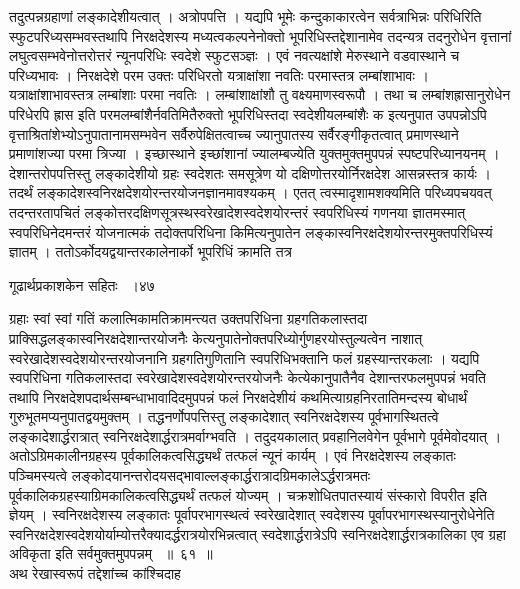 \documentclass[11pt, openany]{book}
\begin{document}
\begin{sloppypar}
\noindent तदुत्पन्नग्रहाणां लङ्कादेशीयत्वात् । अत्रोपपत्ति । यद्यपि भूमेः कन्दुकाकारत्वेन सर्वत्राभिन्नः परिधिरिति स्फुटपरिध्यसम्भवस्तथापि निरक्षदेशस्य मध्यत्वकल्पनेनोक्तो भूपरिधिस्तद्देशानामेव तदन्यत्र तदनुरोधेन वृत्तानां लघुत्वसम्भवेनोत्तरोत्तरं न्यूनपरिधिः स्वदेशे स्फुटसञ्ज्ञः । एवं नवत्यक्षांशे मेरुस्थाने वडवास्थाने च परिध्यभावः । निरक्षदेशे परम उक्तः परिधिरतो यत्राक्षांशा नवतिः परमास्तत्र लम्बांशाभावः । यत्राक्षांशाभावस्तत्र लम्बांशाः परमा नवतिः । लम्बांशाक्षांशौ तु वक्ष्यमाणस्वरूपौ । तथा च लम्बांशह्रासानुरोधेन परिधेरपि ह्रास इति परमलम्बांशैर्नवतिमितैरुक्तो भूपरिधिस्तदा स्वदेशीयलम्बांशैः क इत्यनुपात उपपन्नोऽपि वृत्ताश्रितांशेभ्योऽनुपातानामसम्भवेन सर्वैरुपेक्षितत्वाच्च ज्यानुपातस्य सर्वैरङ्गीकृतत्वात् प्रमाणस्थाने प्रमाणांशज्या परमा त्रिज्या । इच्छास्थाने इच्छांशानां ज्यालम्बज्येति युक्तमुक्तमुपपन्नं स्पष्टपरिध्यानयनम् । देशान्तरोपपत्तिस्तु लङ्कादेशीयो ग्रहः स्वदेशतः समसूत्रेण यो दक्षिणोत्तरयोर्निरक्षदेश आसन्नस्तत्र कार्यः । तदर्थं लङ्कादेशस्वनिरक्षदेशयोरन्तरयोजनज्ञानमावश्यकम् । एतत् त्वस्मादृशामशक्यमिति परिध्यपचयवत् तदन्तरतापचितं लङ्कोत्तरदक्षिणसूत्रस्थस्वरेखादेशस्वदेशयोरन्तरं स्वपरिधिस्यं गणनया ज्ञातमस्मात् स्वपरिधिनेदमन्तरं योजनात्मकं तदोक्तपरिधिना किमित्यनुपातेन लङ्कास्वनिरक्षदेशयोरन्तरमुक्तपरिधिस्यं ज्ञातम् । ततोऽर्कोदयद्वयान्तरकालेनार्को भूपरिधिं क्रामति तत्र
\end{sloppypar}

\newpage

\hspace{3cm}गूढार्थप्रकाशकेन सहितः ~।\hfill ४७
\vspace{1cm}

\begin{sloppypar}
\noindent ग्रहाः स्वां स्वां गतिं कलात्मिकामतिक्रामन्त्यत उक्तपरिधिना ग्रहगतिकलास्तदा प्राक्सिद्धलङ्कास्वनिरक्षदेशान्तरयोजनैः केत्यनुपातेनोक्तपरिध्योर्गुणहरयोस्तुल्यत्वेन नाशात् स्वरेखादेशस्वदेशयोरन्तरयोजनानि ग्रहगतिगुणितानि स्वपरिधिभक्तानि फलं ग्रहस्यान्तरकलाः । यद्यपि स्वपरिधिना गतिकलास्तदा स्वरेखादेशस्वदेशयोरन्तरयोजनैः केत्येकानुपातैनैव देशान्तरफलमुपपन्नं भवति तथापि निरक्षदेशपदार्थसम्बन्धाभावादिदमुपपन्नं फलं निरक्षदेशीयं कथमित्याग्रहनिरतातिमन्दस्य बोधार्थं गुरुभूतमप्यनुपातद्वयमुक्तम् । तद्धनर्णोपपत्तिस्तु लङ्कादेशात् स्वनिरक्षदेशस्य पूर्वभागस्थितत्वे लङ्कादेशार्द्धरात्रात् स्वनिरक्षदेशार्द्धरात्रमर्वाग्भवति । तदुदयकालात् प्रवहानिलवेगेन पूर्वभागे पूर्वमेवोदयात् । अतोऽग्रिमकालीनग्रहस्य पूर्वकालिकत्वसिद्ध्यर्थं तत्फलं न्यूनं कार्यम् । एवं निरक्षदेशस्य लङ्कातः पञ्चिमस्यत्वे लङ्कोदयानन्तरोदयसद्भावाल्लङ्कार्द्धरात्रादग्रिमकालेऽर्द्धरात्रमतः पूर्वकालिकग्रहस्याग्रिमकालिकत्वसिद्ध्यर्थं तत्फलं योज्यम् । चक्रशोधितपातस्यायं संस्कारो विपरीत इति ज्ञेयम् । स्वनिरक्षदेशस्य लङ्कातः पूर्वापरभागस्थत्वं स्वरेखादेशात् स्वदेशस्य पूर्वापरभागस्थस्यानुरोधेनेति स्वनिरक्षदेशस्वदेशयोर्याम्योत्तरैक्यादर्द्धरात्रयोरभिन्नत्वात् स्वदेशार्द्धरात्रेऽपि स्वनिरक्षदेशार्द्धरात्रकालिका एव ग्रहा अविकृता इति सर्वमुक्तमुपपन्नम् ~॥~६१~॥\\
\noindent अथ रेखास्वरूपं तद्देशांच्च कांश्चिदाह\textendash
\end{sloppypar}
\end{document}
